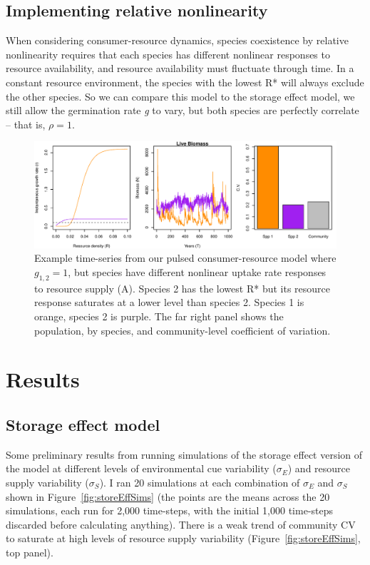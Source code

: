 \documentclass[12pt]{article}
\begin{document}
\subsection{Implementing relative nonlinearity}
When considering consumer-resource dynamics, species coexistence by relative nonlinearity requires that each species has different nonlinear responses to resource availability, and resource availability must fluctuate through time. In a constant resource environment, the species with the lowest R* will always exclude the other species. So we can compare this model to the storage effect model, we still allow the germination rate \emph{g} to vary, but both species are perfectly correlate -- that is, $\rho=1$.  

\begin{figure}
\begin{center}
\includegraphics{Fig-002}
\end{center}
\caption{Example time-series from our pulsed consumer-resource model where $g_{1,2}=1$, but species have different nonlinear uptake rate responses to resource supply (A). Species 2 has the lowest R* but its resource response saturates at a lower level than species 2. Species 1 is orange, species 2 is purple. The far right panel shows the population, by species, and community-level coefficient of variation.}
\end{figure}

\section{Results}
\subsection{Storage effect model}
Some preliminary results from running simulations of the storage effect version of the model at different levels of environmental cue variability ($\sigma_{E}$) and resource supply variability ($\sigma_{S}$). I ran 20 simulations at each combination of $\sigma_{E}$ and $\sigma_{S}$ shown in Figure~\ref{fig:storeEffSims} (the points are the means across the 20 simulations, each run for 2,000 time-steps, with the initial 1,000 time-steps discarded before calculating anything). There is a weak trend of community CV to saturate at high levels of resource supply variability (Figure~\ref{fig:storeEffSims}, top panel). 
\end{document}
